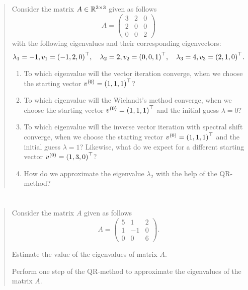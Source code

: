 \documentclass{exercise}
\begin{document}
	\begin{quote}
		Consider the matrix \(A \in \R^{3 \times 3}\) given as follows
		\[
			A = \begin{pmatrix}
				3 & 2 & 0\\
				2 & 0 & 0\\
				0 & 0 & 2
			\end{pmatrix}
		\]
		with the following eigenvalues and their corresponding eigenvectors:
		\[
			\lambda_1 = -1, v_1 = \parentheses*{-1, 2, 0}^\top, \quad \lambda_2 = 2, v_2 = \parentheses*{0, 0, 1}^\top, \quad \lambda_3 = 4, v_3 = \parentheses*{2, 1, 0}^\top.
		\]
		\begin{enumerate}
			\item To which eigenvalue will the vector iteration converge, when we choose the starting vector \(v^{\parentheses*{0}} = \parentheses*{1, 1, 1}^\top\)?
			\item To which eigenvalue will the Wielandt's method converge, when we choose the starting vector \(v^{\parentheses*{0}} = \parentheses*{1, 1, 1}^\top\) and the initial guess \(\lambda = 0\)?
			\item To which eigenvalue will the inverse vector iteration with spectral shift converge, when we choose the starting vector \(v^{\parentheses*{0}} = \parentheses*{1, 1, 1}^\top\) and the initial guess \(\lambda = 1\)?
			Likewise, what do we expect for a different starting vector \(v^{\parentheses*{0}} = \parentheses*{1, 3, 0}^\top\)?
			\item How do we approximate the eigenvalue \(\lambda_2\) with the help of the QR-method?
		\end{enumerate}
	\end{quote}


	\section{}

	\begin{quote}
		Consider the matrix \(A\) given as follows
		\[
			A = \begin{pmatrix}
				5 & 1 & 2\\
				1 & -1 & 0\\
				0 & 0 & 6
			\end{pmatrix}.
		\]
		\item Estimate the value of the eigenvalues of matrix \(A\).
		\item Perform one step of the QR-method to approximate the eigenvalues of the matrix \(A\).
	\end{quote}
\end{document}
